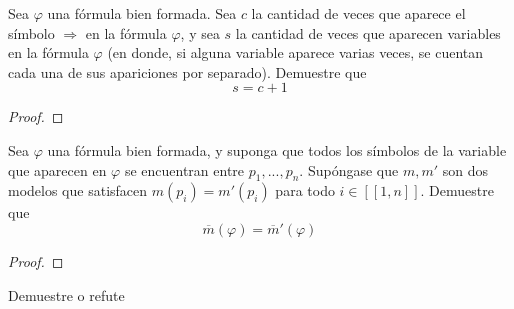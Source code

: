 \documentclass[12pt]{report}
\theoremstyle{largebreak}
\newcommand\natint[1]{\ensuremath{\left[\!\left[ #1\right]\!\right]}}
\begin{document}
    \begin{excer}
        Sea $\varphi$ una fórmula bien formada. Sea $c$ la cantidad de veces que aparece el símbolo $\Rightarrow$ en la fórmula $\varphi$, y sea $s$ la cantidad de veces que aparecen variables en la fórmula $\varphi$ (en donde, si alguna variable aparece varias veces, se cuentan cada una de sus apariciones por separado). Demuestre que
        \begin{equation*}
            s=c+1
        \end{equation*}
    \end{excer}

    \begin{proof}
        
    \end{proof}

    \begin{excer}
        Sea $\varphi$ una fórmula bien formada, y suponga que todos los símbolos de la variable que aparecen en $\varphi$ se encuentran entre $p_1,...,p_n$. Supóngase que $m,m'$ son dos modelos que satisfacen $m(p_i)=m'(p_i)$ para todo $i\in\natint{1,n}$. Demuestre que
        \begin{equation*}
            \overline{m}(\varphi)=\overline{m}'(\varphi)
        \end{equation*}
    \end{excer}

    \begin{proof}
        
    \end{proof}

    \begin{excer}
        Demuestre o refute 
    \end{excer}
\end{document}
